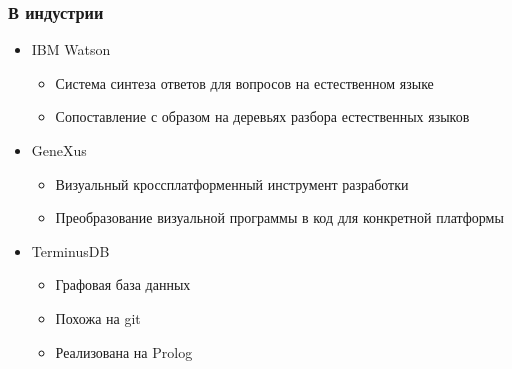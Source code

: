 \documentclass{../../slides-style}
\begin{document}
        \begin{frame}
        \frametitle{В индустрии}
        \begin{itemize}
            \item IBM Watson 
            \begin{itemize}
                \item Система синтеза ответов для вопросов на естественном языке
                \item Сопоставление с образом на деревьях разбора естественных языков
            \end{itemize}
            \vspace{2mm}
            \item GeneXus 
            \begin{itemize}
                \item Визуальный кроссплатформенный инструмент разработки
                \item Преобразование визуальной программы в код для конкретной платформы
            \end{itemize}
            \vspace{2mm}
            \item TerminusDB
            \begin{itemize}
                \item Графовая база данных
                \item Похожа на git
                \item Реализована на Prolog
            \end{itemize}
        \end{itemize}
    \end{frame}
\end{document}
